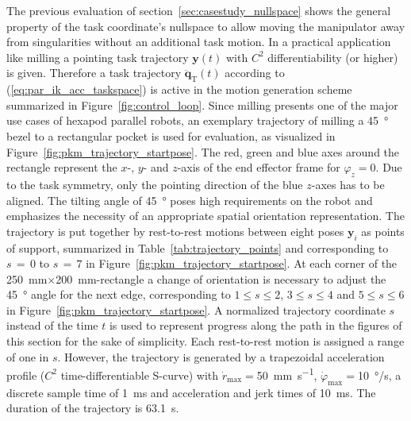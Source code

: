 \documentclass[a4paper,twoside]{article}
\begin{document}
The previous evaluation of section~\ref{sec:casestudy_nullspace} shows the general property of the task coordinate's nullspace to allow moving the manipulator away from singularities without an additional task motion.
In a practical application like milling a pointing task trajectory $\bm{y}(t)$ with $C^2$ differentiability (or higher) is given.
Therefore a task trajectory $\ddot{\bm{q}}_\mathrm{T}(t)$ 
according to (\ref{eq:par_ik_acc_taskspace}) is active in the motion generation scheme summarized in Figure~\ref{fig:control_loop}.
Since milling presents one of the major use cases of hexapod parallel robots, an exemplary trajectory of milling a \SI{45}{\degree} bezel to a rectangular pocket is used for evaluation, as visualized in Figure~\ref{fig:pkm_trajectory_startpose}.
The red, green and blue axes around the rectangle represent the $x$-, $y$- and $z$-axis of the end effector frame for $\varphi_z{=}0$.
Due to the task symmetry, only the pointing direction of the blue $z$-axes has to be aligned.
The tilting angle of \SI{45}{\degree} poses high requirements on the robot and emphasizes the necessity of an appropriate spatial orientation representation.
The trajectory is put together by rest-to-rest motions between eight poses $\bm{y}_i$ as points of support, summarized in Table~\ref{tab:trajectory_points} and corresponding to $s\,{=}\,0$ to $s\,{=}\,7$ in Figure~\ref{fig:pkm_trajectory_startpose}.
At each corner of the \SI{250}{\milli\metre}$\times$\SI{200}{\milli\metre}-rectangle a change of orientation is necessary to adjust the \SI{45}{\degree} angle for the next edge, corresponding to $1{\leq}s{\leq}2$, $3{\leq}s{\leq}4$ and $5{\leq}s{\leq}6$ in Figure~\ref{fig:pkm_trajectory_startpose}.
A normalized trajectory coordinate $s$ instead of the time $t$ is used to represent progress along the path in the figures of this section for the sake of simplicity.
Each rest-to-rest motion is assigned a range of one in $s$.
However, the trajectory is generated by a trapezoidal acceleration  profile ($C^2$ time-differentiable S-curve) with  $\dot{r}_{\mathrm{max}}{=}$\SI{50}{\milli\metre\per\second}, $\dot{\varphi}_{\mathrm{max}}{=}$\SI{10}{\degree}/s, a discrete sample time of \SI{1}{\milli\second} and acceleration and jerk times of \SI{10}{\milli\second}.
The duration of the trajectory is \SI{63.1}{\second}.
\end{document}
